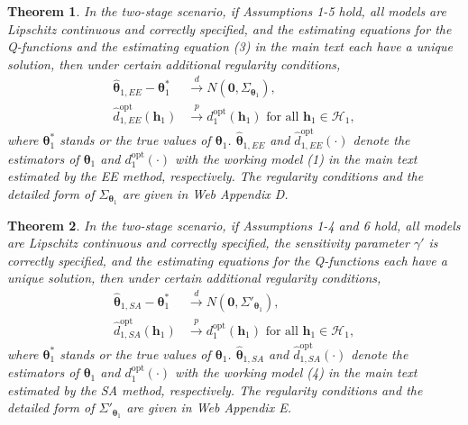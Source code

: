 \documentclass[12pt]{article}
\newtheorem{theorem}{Theorem}
\begin{document}
\begin{theorem}
In the two-stage scenario, if Assumptions 1-5 hold, all models are Lipschitz continuous and correctly specified, and the estimating equations for the Q-functions and the estimating equation (3)  in the main text each have a unique solution, then under certain additional regularity conditions, 
\begin{align*}
    \widehat{\bm{\theta}}_{1,EE} - \bm{\theta}_{1}^* &\stackrel{d}{\longrightarrow} N(\bm{0}, \Sigma_{\bm{\theta}_1}) , \\
    \widehat{d}_{1,EE}^{\mathrm{opt}}(\bm{h}_1) & \stackrel{p}{\longrightarrow} d_1^{\mathrm{opt}}(\bm{h}_1) \text{ for all } \bm{h}_1 \in \mathcal{H}_1,
\end{align*}
where $\bm{\theta}_{1}^*$ stands or the true values of $\bm{\theta}_{1}$. $\widehat{\bm{\theta}}_{1,EE}$ and $\widehat{d}_{1,EE}^{\mathrm{opt}}(\cdot)$ denote the estimators of $\bm{\theta}_{1}$ and $d_1^{\mathrm{opt}}(\cdot)$ with the working model (1) in the main text estimated by the EE method, respectively. The regularity conditions and the detailed form of $\Sigma_{\bm{\theta}_1}$ are given in Web Appendix  D.
\end{theorem}


\begin{theorem}
In the two-stage scenario, if Assumptions 1-4 and 6 hold, all models are Lipschitz continuous and correctly specified, the sensitivity parameter $\gamma'$ is correctly specified, and the estimating equations for the Q-functions each have a unique solution, then under certain additional regularity conditions, 
\begin{align*}
    \widehat{\bm{\theta}}_{1,SA} - \bm{\theta}_{1}^* &\stackrel{d}{\longrightarrow} N(\bm{0}, \Sigma'_{\bm{\theta}_1}) , \\
    \widehat{d}_{1,SA}^{\mathrm{opt}}(\bm{h}_1) & \stackrel{p}{\longrightarrow} d_1^{\mathrm{opt}}(\bm{h}_1) \text{ for all } \bm{h}_1 \in \mathcal{H}_1,
\end{align*}
where $\bm{\theta}_{1}^*$ stands or the true values of $\bm{\theta}_{1}$. 
$\widehat{\bm{\theta}}_{1,SA}$ and $\widehat{d}_{1,SA}^{\mathrm{opt}}(\cdot)$ denote the estimators of $\bm{\theta}_{1}$ and $d_1^{\mathrm{opt}}(\cdot)$ with the working model (4) in the main text estimated by the SA method, respectively. The regularity conditions and the detailed form of $\Sigma'_{\bm{\theta}_1}$ are given in  Web Appendix  E.
\end{theorem}
\end{document}
